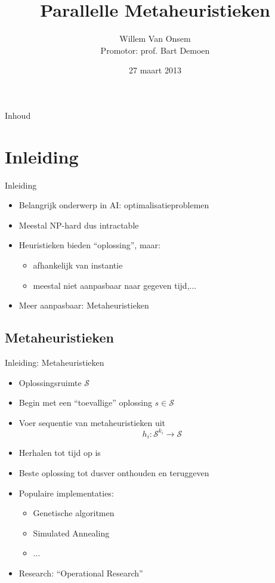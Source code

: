 \documentclass[handout]{beamer}
\title{Parallelle Metaheuristieken}
\author{Willem Van Onsem\\Promotor: prof. Bart Demoen}
\date{27 maart 2013}
\newcommand{\sol}{\mathcal{S}}
\begin{document}
\begin{frame}[plain]
\maketitle
\end{frame}
\begin{frame}{Inhoud}
\tableofcontents
\end{frame}
\section{Inleiding}
\begin{frame}{Inleiding}
\begin{itemize}[<+->]
 \item Belangrijk onderwerp in AI: optimalisatieproblemen
 \item Meestal NP-hard dus intractable
 \item Heuristieken bieden ``oplossing'', maar:
 \begin{itemize}[<+->]
  \item afhankelijk van instantie
  \item meestal niet aanpasbaar naar gegeven tijd,...
 \end{itemize}
 \item Meer aanpasbaar: Metaheuristieken
\end{itemize}
\end{frame}
\subsection{Metaheuristieken}
\begin{frame}{Inleiding: Metaheuristieken}
\begin{itemize}[<+->]
 \item Oplossingsruimte $\sol$
 \item Begin met een ``toevallige'' oplossing $s\in\sol$
 \item Voer sequentie van metaheuristieken uit
 \begin{equation}
  h_i:\sol^{k_i}\rightarrow\sol
 \end{equation}
 \item Herhalen tot tijd op is
 \item Beste oplossing tot dusver onthouden en teruggeven
 \item Populaire implementaties:
 \begin{itemize}[<+->]
   \item Genetische algoritmen
   \item Simulated Annealing
   \item ...
 \end{itemize}
 \item Research: ``Operational Research''
\end{itemize}
\end{frame}
\end{document}
